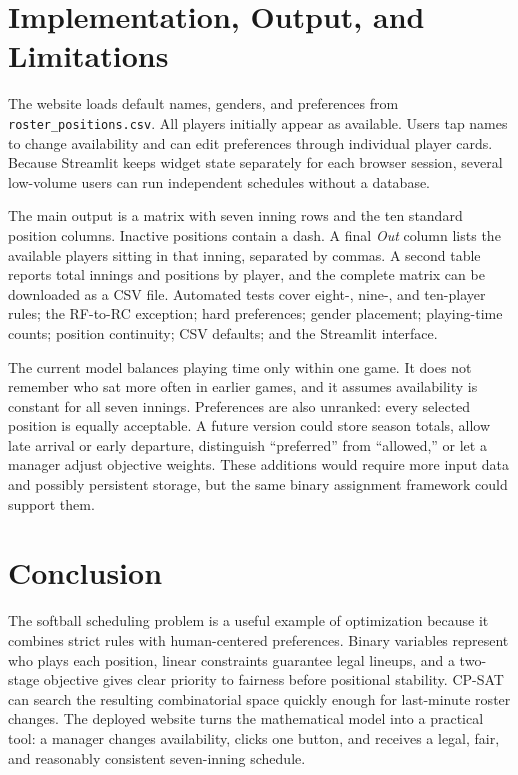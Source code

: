 \documentclass[11pt]{article}
\newcommand{\code}[1]{\texttt{#1}}
\begin{document}
\section{Implementation, Output, and Limitations}

The website loads default names, genders, and preferences from
\code{roster\_positions.csv}. All players initially appear as available.
Users tap names to change availability and can edit preferences through
individual player cards. Because Streamlit keeps widget state separately for
each browser session, several low-volume users can run independent schedules
without a database.

The main output is a matrix with seven inning rows and the ten standard
position columns. Inactive positions contain a dash. A final \emph{Out} column
lists the available players sitting in that inning, separated by commas. A
second table reports total innings and positions by player, and the complete
matrix can be downloaded as a CSV file. Automated tests cover eight-, nine-,
and ten-player rules; the RF-to-RC exception; hard preferences; gender
placement; playing-time counts; position continuity; CSV defaults; and the
Streamlit interface.

The current model balances playing time only within one game. It does not
remember who sat more often in earlier games, and it assumes availability is
constant for all seven innings. Preferences are also unranked: every selected
position is equally acceptable. A future version could store season totals,
allow late arrival or early departure, distinguish ``preferred'' from
``allowed,'' or let a manager adjust objective weights. These additions would
require more input data and possibly persistent storage, but the same binary
assignment framework could support them.

\section{Conclusion}

The softball scheduling problem is a useful example of optimization because
it combines strict rules with human-centered preferences. Binary variables
represent who plays each position, linear constraints guarantee legal
lineups, and a two-stage objective gives clear priority to fairness before
positional stability. CP-SAT can search the resulting combinatorial space
quickly enough for last-minute roster changes. The deployed website turns the
mathematical model into a practical tool: a manager changes availability,
clicks one button, and receives a legal, fair, and reasonably consistent
seven-inning schedule.
\end{document}
